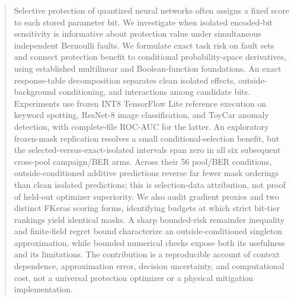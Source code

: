 \documentclass[manuscript,screen,review]{acmart}
\begin{document}
\begin{abstract}
Selective protection of quantized neural networks often assigns a fixed score to each stored parameter bit. We investigate when isolated encoded-bit sensitivity is informative about protection value under simultaneous independent Bernoulli faults. We formulate exact task risk on fault sets and connect protection benefit to conditional probability-space derivatives, using established multilinear and Boolean-function foundations. An exact response-table decomposition separates clean isolated effects, outside-background conditioning, and interactions among candidate bits. Experiments use frozen INT8 TensorFlow Lite reference execution on keyword spotting, ResNet-8 image classification, and ToyCar anomaly detection, with complete-file ROC-AUC for the latter. An exploratory frozen-mask replication resolves a small conditional-selection benefit, but the selected-versus-exact-isolated intervals span zero in all six subsequent cross-pool campaign/BER arms. Across their 56 pool/BER conditions, outside-conditioned additive predictions reverse far fewer mask orderings than clean isolated predictions; this is selection-data attribution, not proof of held-out optimizer superiority. We also audit gradient proxies and two distinct FKeras scoring forms, identifying budgets at which strict bit-tier rankings yield identical masks. A sharp bounded-risk remainder inequality and finite-field regret bound characterize an outside-conditioned singleton approximation, while bounded numerical checks expose both its usefulness and its limitations. The contribution is a reproducible account of context dependence, approximation error, decision uncertainty, and computational cost, not a universal protection optimizer or a physical mitigation implementation.
\end{abstract}
\maketitle












\end{document}
